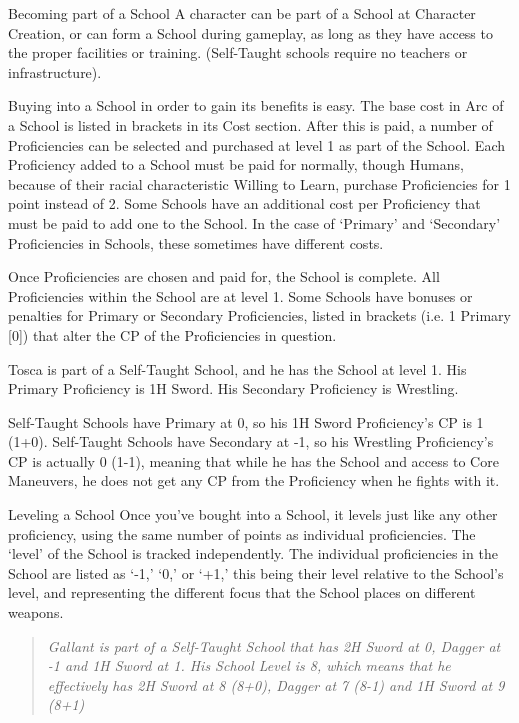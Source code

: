 \documentclass[oneside,11pt,english]{book}
\begin{document}
 

Becoming part of a School 
A character can be part of a School at Character Creation, or can form a School during gameplay, as long 
as they have access to the proper facilities or training. (Self-Taught schools require no teachers or 
infrastructure). 

 

Buying into a School in order to gain its benefits is easy. The base cost in Arc of a School is listed in 
brackets in its Cost section. After this is paid, a number of Proficiencies can be selected and purchased at 
level 1 as part of the School. Each Proficiency added to a School must be paid for normally, though 
Humans, because of their racial characteristic Willing to Learn, purchase Proficiencies for 1 point instead 
of 2. Some Schools have an additional cost per Proficiency that must be paid to add one to the School. In 
the case of ‘Primary’ and ‘Secondary’ Proficiencies in Schools, these sometimes have different costs. 

 

Once Proficiencies are chosen and paid for, the School is complete. All Proficiencies within the School 
are at level 1. Some Schools have bonuses or penalties for Primary or Secondary Proficiencies, listed in 
brackets (i.e. 1 Primary [0]) that alter the CP of the Proficiencies in question. 

 

Tosca is part of a Self-Taught School, and he has the School at level 1. His Primary Proficiency is 1H 
Sword. His Secondary Proficiency is Wrestling. 

 

Self-Taught Schools have Primary at 0, so his 1H Sword Proficiency’s CP is 1 (1+0). Self-Taught Schools 
have Secondary at -1, so his Wrestling Proficiency’s CP is actually 0 (1-1), meaning that while he has the 
School and access to Core Maneuvers, he does not get any CP from the Proficiency when he fights with 
it. 

 

Leveling a School
Once you’ve bought into a School, it levels just like any other proficiency, using the same number of 
points as individual proficiencies. The ‘level’ of the School is tracked independently. The individual 
proficiencies in the School are listed as ‘-1,’ ‘0,’ or ‘+1,’ this being their level relative to the School’s 
level, and representing the different focus that the School places on different weapons. 

\begin{quote}
	\emph{Gallant is part of a Self-Taught School that has 2H Sword at 0, Dagger at -1 and 1H Sword at 1. His School Level is 8, which means that he effectively has 2H Sword at 8 (8+0), Dagger at 7 (8-1) and 1H Sword at 9 (8+1)}
\end{quote}
\end{document}
